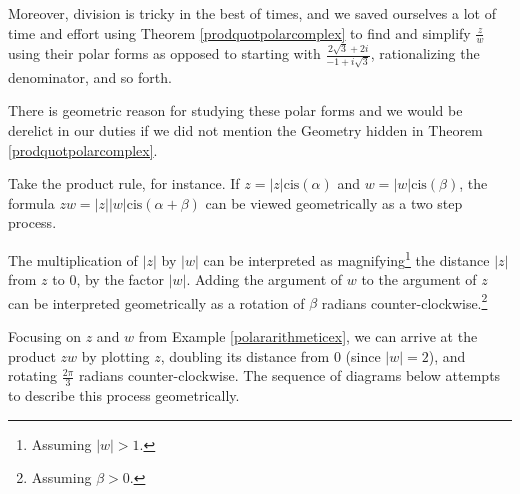 \documentclass{ximera}
\begin{document}
\smallskip

Moreover,  division is tricky in the best of times, and we saved ourselves a lot of time and effort using Theorem \ref{prodquotpolarcomplex} to find and simplify $\frac{z}{w}$ using their polar forms as opposed to starting with $\frac{2\sqrt{3} + 2i}{-1 + i\sqrt{3}}$, rationalizing the denominator, and so forth.    

\smallskip

There is geometric reason for studying these polar forms and we would be derelict in our duties if we did not mention the Geometry hidden in Theorem \ref{prodquotpolarcomplex}.  

\smallskip

Take the product rule, for instance. If $z = |z| \text{cis}(\alpha)$ and $w = |w| \text{cis}(\beta)$, the formula $zw = |z||w| \text{cis}(\alpha + \beta)$ can be viewed geometrically as a two step process. 

\smallskip

 The multiplication of $|z|$ by $|w|$ can be interpreted as magnifying\footnote{Assuming $|w| > 1$.} the distance $|z|$ from $z$ to $0$, by the factor $|w|$. Adding the argument of $w$ to the argument of $z$ can be interpreted geometrically as a rotation of $\beta$ radians counter-clockwise.\footnote{Assuming $\beta > 0$.} 
 
 \smallskip
 
  Focusing on $z$ and $w$ from Example \ref{polararithmeticex}, we can arrive at the product $zw$ by plotting $z$, doubling its distance from $0$ (since $|w| = 2$), and rotating $\frac{2\pi}{3}$ radians counter-clockwise. The sequence of diagrams below attempts to describe this process geometrically.
\end{document}
